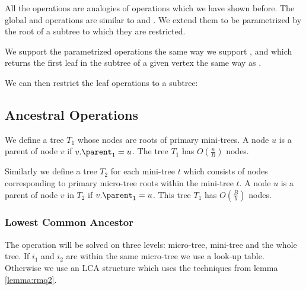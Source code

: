 All the \leafAny{} operations are analogies of operations which we have shown before.
The global \leafRank{} and \leafSelect{} operations are similar to \preRank{} and \preSelect{}.
We extend them to be parametrized by the root of a subtree to which they are restricted.

We support the parametrized operations \leafSize{} the same way we support \subtreeSize{}, and \leafFirst{} which returns the first leaf in the subtree of a given vertex the same way as \deepestVertex{}.

We can then restrict the leaf operations to a subtree:
\begin{algorithm}
\begin{algorithmic}
	\State {}
\EndFunction
\end{algorithmic}
\end{algorithm}

\begin{algorithm}
\begin{algorithmic}
	\State {}
\EndFunction
\end{algorithmic}
\end{algorithm}

\subsection{Ancestral Operations}

We define a tree $T_1$ whose nodes are roots of primary mini-trees.
A node $u$ is a parent of node $v$ if $v.\parent_1 = u$.
The tree $T_1$ has $O(\frac{n}{B})$ nodes.

Similarly we define a tree $T_2$ for each mini-tree $t$ which consists of nodes corresponding to primary micro-tree roots within the mini-tree $t$.
A node $u$ is a parent of node $v$ in $T_2$ if $v.\parent_1 = u$.
This tree $T_1$ has $O(\frac{B}{b})$ nodes.

\subsubsection{Lowest Common Ancestor}

The operation \lca{} will be solved on three levels: micro-tree, mini-tree and the whole tree.
If $i_1$ and $i_2$ are within the same micro-tree we use a look-up table.
Otherwise we use an LCA structure which uses the techniques from lemma \ref{lemma:rmq2}.

